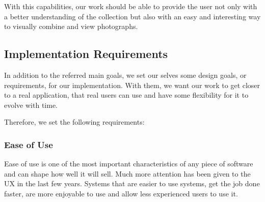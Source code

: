 With this capabilities, our work should be able to provide the user not only with a better understanding of the collection but also with an easy and interesting way to visually combine and view photographs.







\subsection{Implementation Requirements} %
\label{sub:Implementation_Requirements}

In addition to the referred main goals, we set our selves some design goals, or requirements, for our implementation. With them, we want our work to get closer to a real application, that real users can use and have some flexibility for it to evolve with time.

Therefore, we set the following requirements:

\subsubsection{Ease of Use} %
\label{ssub:ease_of_use}

Ease of use is one of the most important characteristics of any piece of software and can shape how well it will sell. Much more attention has been given to the \ac{UX} in the last few years. Systems that are easier to use systems, get the job done faster, are more enjoyable to use and allow less experienced users to use it.

